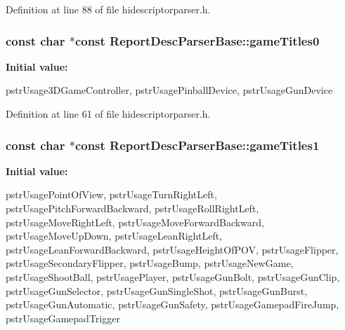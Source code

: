 \-Definition at line 88 of file hidescriptorparser.\-h.

\hypertarget{class_report_desc_parser_base_a981cacbfad335b19528e59ab2de866e5}{
\subsubsection[{game\-Titles0}]{\setlength{\rightskip}{0pt plus 5cm}const char $\ast$const {\bf \-Report\-Desc\-Parser\-Base\-::game\-Titles0}}}\label{class_report_desc_parser_base_a981cacbfad335b19528e59ab2de866e5}
{\bfseries \-Initial value\-:}
\begin{DoxyCode}
 {
        pstrUsage3DGameController,
        pstrUsagePinballDevice,
        pstrUsageGunDevice
}
\end{DoxyCode}


\-Definition at line 61 of file hidescriptorparser.\-h.

\hypertarget{class_report_desc_parser_base_ac9327d02115b1dd60c79c37d1d11cf41}{
\subsubsection[{game\-Titles1}]{\setlength{\rightskip}{0pt plus 5cm}const char $\ast$const {\bf \-Report\-Desc\-Parser\-Base\-::game\-Titles1}}}\label{class_report_desc_parser_base_ac9327d02115b1dd60c79c37d1d11cf41}
{\bfseries \-Initial value\-:}
\begin{DoxyCode}
 {
        pstrUsagePointOfView,
        pstrUsageTurnRightLeft,
        pstrUsagePitchForwardBackward,
        pstrUsageRollRightLeft,
        pstrUsageMoveRightLeft,
        pstrUsageMoveForwardBackward,
        pstrUsageMoveUpDown,
        pstrUsageLeanRightLeft,
        pstrUsageLeanForwardBackward,
        pstrUsageHeightOfPOV,
        pstrUsageFlipper,
        pstrUsageSecondaryFlipper,
        pstrUsageBump,
        pstrUsageNewGame,
        pstrUsageShootBall,
        pstrUsagePlayer,
        pstrUsageGunBolt,
        pstrUsageGunClip,
        pstrUsageGunSelector,
        pstrUsageGunSingleShot,
        pstrUsageGunBurst,
        pstrUsageGunAutomatic,
        pstrUsageGunSafety,
        pstrUsageGamepadFireJump,
        pstrUsageGamepadTrigger
}
\end{DoxyCode}


